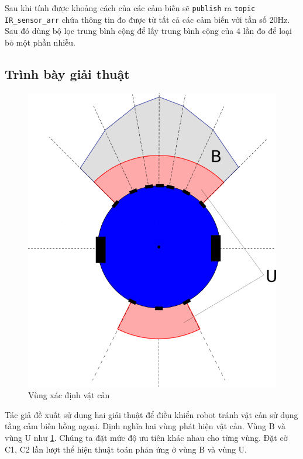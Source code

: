 Sau khi tính được khoảng cách của các cảm biến sẽ {\tt publish} ra {\tt topic IR\_sensor\_arr} chứa thông tin đo được từ tất cả các cảm biến với tần số 20Hz.
Sau đó dùng bộ lọc trung bình cộng để lấy trung bình cộng của 4 lần đo để loại bỏ một phần nhiễu.

\subsection{Trình bày giải thuật}

\begin{figure}[htbp]
    \centering
    \includegraphics[width=0.5\linewidth]{figures/arg_obstacle-detection-area.png}
    \caption{Vùng xác định vật cản}
    \label{fig:arg-obstacle-area}
\end{figure}

Tác giả đề xuất sử dụng hai giải thuật để điều khiển robot tránh vật cản sử dụng tầng cảm biến hồng ngoại. Định nghĩa hai vùng phát hiện vật cản. Vùng B và vùng U như \figurename{\ref{fig:arg-obstacle-area}}. Chúng ta đặt mức độ ưu tiên khác nhau cho từng vùng. Đặt cờ C1, C2 lần lượt thể hiện thuật toán phản ứng ở vùng B và vùng U.


